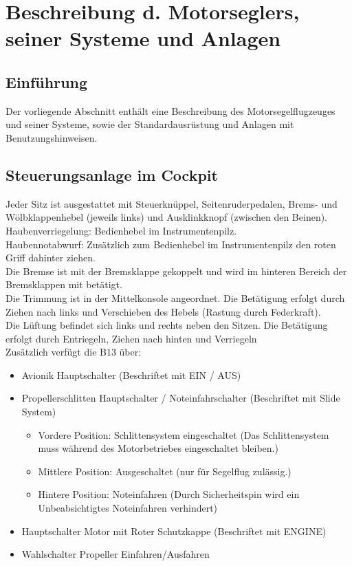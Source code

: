 \chapter{ Beschreibung d. Motorseglers, seiner Systeme und Anlagen}

\section{Einführung}
Der vorliegende Abschnitt enthält eine Beschreibung des Motorsegelflugzeuges und seiner Systeme, sowie der Standardausrüstung und Anlagen mit Benutzungshinweisen. 

\section{Steuerungsanlage im Cockpit}
Jeder Sitz ist ausgestattet mit Steuerknüppel, Seitenruderpedalen, Brems- und Wölbklappenhebel (jeweils links) und Ausklinkknopf (zwischen den Beinen).\\
Haubenverriegelung: Bedienhebel im Instrumentenpilz.\\
Haubennotabwurf: Zusätzlich zum Bedienhebel im Instrumentenpilz den roten Griff dahinter ziehen.\\
Die Bremse ist mit der Bremsklappe gekoppelt und wird im hinteren Bereich der Bremsklappen mit betätigt.\\
Die Trimmung ist in der Mittelkonsole angeordnet. Die Betätigung erfolgt durch Ziehen nach links und Verschieben des Hebels (Rastung durch Federkraft).\\
Die Lüftung befindet sich links und rechts neben den Sitzen. Die Betätigung erfolgt durch Entriegeln,  Ziehen nach hinten und Verriegeln\\

Zusätzlich verfügt die B13 über:

\begin{itemize}
\item Avionik Hauptschalter (Beschriftet mit EIN / AUS)
\item Propellerschlitten Hauptschalter / Noteinfahrschalter (Beschriftet mit Slide System)
\begin{itemize}
\item Vordere Position: Schlittensystem eingeschaltet (Das Schlittensystem muss während des Motorbetriebes eingeschaltet bleiben.)
\item Mittlere Position: Ausgeschaltet (nur für Segelflug zulässig.)
\item Hintere Position: Noteinfahren (Durch Sicherheitspin wird ein Unbeabsichtigtes Noteinfahren verhindert)
\end{itemize}
\item Hauptschalter Motor mit Roter Schutzkappe (Beschriftet mit ENGINE)
\item Wahlschalter Propeller Einfahren/Ausfahren
\end{itemize}


